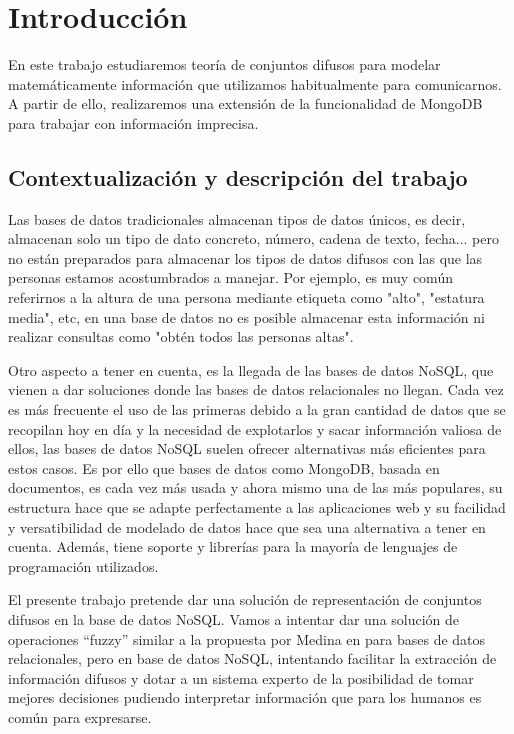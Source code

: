 \section{Introducción}

En este trabajo estudiaremos teoría de conjuntos difusos para modelar matemáticamente información que utilizamos habitualmente para comunicarnos. A partir de ello, realizaremos una extensión de la funcionalidad de MongoDB para trabajar con información imprecisa.

\subsection{Contextualización y descripción del trabajo}

Las bases de datos tradicionales almacenan tipos de datos únicos, es decir, almacenan solo un tipo de dato concreto, número, cadena de texto, fecha... pero no están preparados para almacenar los tipos de datos difusos con las que las personas estamos acostumbrados a manejar. Por ejemplo, es muy común referirnos a la altura de una persona mediante etiqueta como "alto", "estatura media", etc, en una base de datos no es posible almacenar esta información ni realizar consultas como "obtén todos las personas altas". 

Otro aspecto a tener en cuenta, es la llegada de las bases de datos NoSQL, que vienen a dar soluciones donde las bases de datos relacionales no llegan. Cada vez es más frecuente el uso de las primeras debido a la gran cantidad de datos que se recopilan hoy en día y la necesidad de explotarlos y sacar información valiosa de ellos, las bases de datos NoSQL suelen ofrecer alternativas más eficientes para estos casos. Es por ello que bases de datos como MongoDB, basada en documentos, es cada vez más usada y ahora mismo una de las más populares, su estructura hace que se adapte perfectamente a las aplicaciones web y su facilidad y versatibilidad de modelado de datos hace que sea una alternativa a tener en cuenta. Además, tiene soporte y librerías para la mayoría de lenguajes de programación utilizados.

El presente trabajo pretende dar una solución de representación de conjuntos difusos en la base de datos NoSQL. Vamos a intentar dar una solución de operaciones ``fuzzy'' similar a la propuesta por Medina en \cite{tesismedina} para bases de datos relacionales, pero en base de datos NoSQL, intentando facilitar la extracción de información difusos y dotar a un sistema experto de la posibilidad de tomar mejores decisiones pudiendo interpretar información que para los humanos es común para expresarse.

